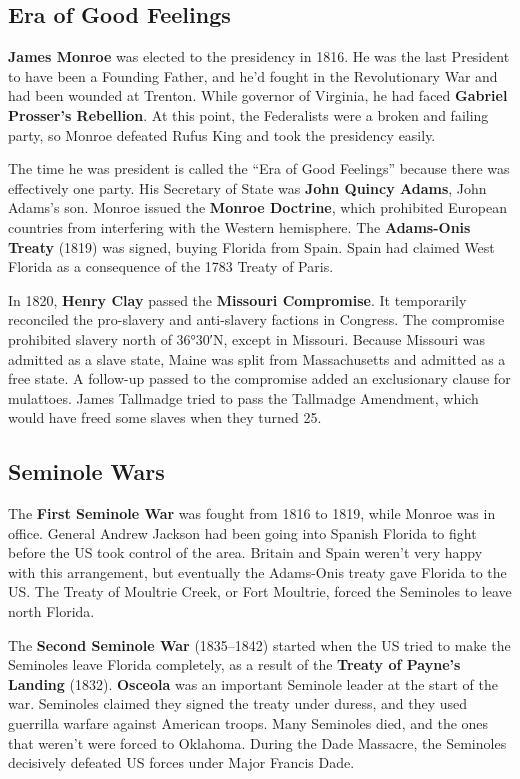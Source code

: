 \subsection*{Era of Good Feelings}

\textbf{James Monroe} was elected to the presidency in 1816.
He was the last President to have been a Founding Father,
and he'd fought in the Revolutionary War and had been wounded at Trenton.
While governor of Virginia, he had faced \textbf{Gabriel Prosser's Rebellion}.
At this point, the Federalists were a broken and failing party,
so Monroe defeated Rufus King and took the presidency easily.

The time he was president is called the ``Era of Good Feelings'' because there was effectively one party.
His Secretary of State was \textbf{John Quincy Adams}, John Adams's son.
Monroe issued the \textbf{Monroe Doctrine},
which prohibited European countries from interfering with the Western hemisphere.
The \textbf{Adams-Onis Treaty} (1819) was signed, buying Florida from Spain.
Spain had claimed West Florida as a consequence of the 1783 Treaty of Paris.

In 1820, \textbf{Henry Clay} passed the \textbf{Missouri Compromise}.
It temporarily reconciled the pro-slavery and anti-slavery factions in Congress.
The compromise prohibited slavery north of \ang{36;30;}N, except in Missouri.
Because Missouri was admitted as a slave state, Maine was split from Massachusetts and admitted as a free state.
A follow-up passed to the compromise added an exclusionary clause for mulattoes.
James Tallmadge tried to pass the Tallmadge Amendment, which would have freed some slaves when they turned 25.

\subsection*{Seminole Wars}

The \textbf{First Seminole War} was fought from 1816 to 1819, while Monroe was in office.
General Andrew Jackson had been going into Spanish Florida to fight before the US took control of the area.
Britain and Spain weren't very happy with this arrangement,
but eventually the Adams-Onis treaty gave Florida to the US\@.
The Treaty of Moultrie Creek, or Fort Moultrie, forced the Seminoles to leave north Florida.

The \textbf{Second Seminole War} (1835--1842) started when the US tried to make the Seminoles leave Florida completely,
as a result of the \textbf{Treaty of Payne's Landing} (1832).
\textbf{Osceola} was an important Seminole leader at the start of the war.
Seminoles claimed they signed the treaty under duress, and they used guerrilla warfare against American troops.
Many Seminoles died, and the ones that weren't were forced to Oklahoma.
During the Dade Massacre, the Seminoles decisively defeated US forces under Major Francis Dade.

